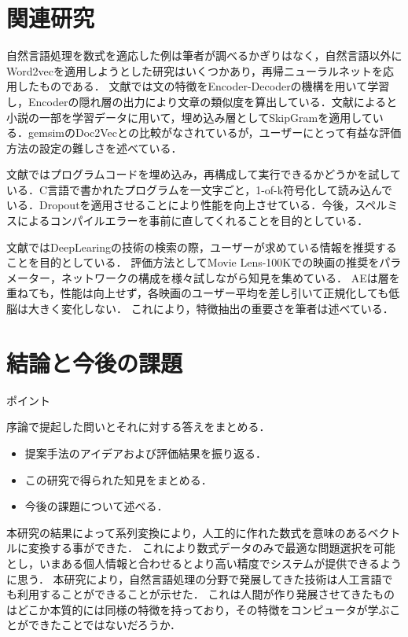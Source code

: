 \documentclass[a4j,11pt,report]{jsbook}
\newcommand{\point}[1]{
\begin{itembox}[l]{ポイント}
  #1
\end{itembox}
}
\begin{document}
\chapter{関連研究\label{ch:relsatedwork}}
自然言語処理を数式を適応した例は筆者が調べるかぎりはなく，自然言語以外にWord2vecを適用しようとした研究はいくつかあり，再帰ニューラルネットを応用したものである．
文献\cite{kannrenn3}では文の特徴をEncoder-Decoderの機構を用いて学習し，Encoderの隠れ層の出力により文章の類似度を算出している．文献\cite{kannrenn3}によると小説の一部を学習データに用いて，埋め込み層としてSkipGramを適用している．gemsimのDoc2Vecとの比較がなされているが，ユーザーにとって有益な評価方法の設定の難しさを述べている．

文献\cite{lannrenn4}ではプログラムコードを埋め込み，再構成して実行できるかどうかを試している．C言語で書かれたプログラムを一文字ごと，1-of-k符号化して読み込んでいる．Dropoutを適用させることにより性能を向上させている．今後，スペルミスによるコンパイルエラーを事前に直してくれることを目的としている．

文献\cite{kannrenn5}ではDeepLearingの技術の検索の際，ユーザーが求めている情報を推奨することを目的としている．
評価方法としてMovie Lens-100Kでの映画の推奨をパラメーター，ネットワークの構成を様々試しながら知見を集めている．
AEは層を重ねても，性能は向上せず，各映画のユーザー平均を差し引いて正規化しても低脳は大きく変化しない．
これにより，特徴抽出の重要さを筆者は述べている．





\chapter{結論と今後の課題 \label{ch:conclusion}}
\point{
序論で提起した問いとそれに対する答えをまとめる．
\begin{itemize}
  \item 提案手法のアイデアおよび評価結果を振り返る．
  \item この研究で得られた知見をまとめる．
  \item 今後の課題について述べる．
\end{itemize}
}
\fi

本研究の結果によって系列変換により，人工的に作れた数式を意味のあるベクトルに変換する事ができた．
これにより数式データのみで最適な問題選択を可能とし，いまある個人情報と合わせるとより高い精度でシステムが提供できるように思う．
本研究により，自然言語処理の分野で発展してきた技術は人工言語でも利用することができることが示せた．
これは人間が作り発展させてきたものはどこか本質的には同様の特徴を持っており，その特徴をコンピュータが学ぶことができたことではないだろうか．
\end{document}
